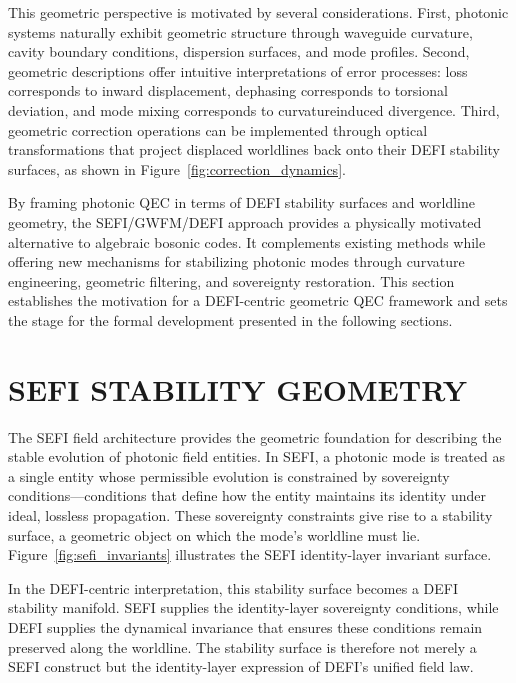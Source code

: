\documentclass[aip,adv,reprint,floatfix]{revtex4-2}
\begin{document}
This geometric perspective is motivated by several considerations. First, photonic systems naturally exhibit
geometric structure through waveguide curvature, cavity boundary conditions, dispersion surfaces, and mode
profiles.\cite{DuttonElectronField2026} Second, geometric descriptions offer intuitive
interpretations of error processes: loss corresponds to inward displacement, dephasing corresponds to torsional
deviation, and mode mixing corresponds to curvatureinduced divergence. Third, geometric correction operations can be implemented through optical transformations that project displaced worldlines back onto their
DEFI stability surfaces, as shown in Figure~\ref{fig:correction_dynamics}.

By framing photonic QEC in terms of DEFI
stability surfaces and worldline geometry, the
SEFI/GWFM/DEFI approach provides a physically motivated alternative to algebraic bosonic codes.\cite{DuttonSEFI2026}
It complements existing methods while offering new
mechanisms for stabilizing photonic modes through curvature engineering, geometric filtering, and sovereignty
restoration. This section establishes the motivation
for a DEFI-centric geometric QEC framework and sets
the stage for the formal development presented in the
following sections.
\section{SEFI STABILITY GEOMETRY}

The SEFI field architecture provides the geometric
foundation for describing the stable evolution of photonic field entities.\cite{DuttonSEFI2026} In SEFI, a photonic mode is treated
as a single entity whose permissible evolution is constrained by sovereignty conditions—conditions that define how the entity maintains its identity under ideal,
lossless propagation. These sovereignty constraints give
rise to a stability surface, a geometric object on which
the mode’s worldline must lie. Figure~\ref{fig:sefi_invariants}
illustrates the SEFI identity-layer invariant surface.

In the DEFI-centric interpretation, this stability surface becomes a DEFI stability manifold.\cite{DuttonSEFI2026,DuttonElectronField2026}
SEFI supplies the identity-layer sovereignty conditions,
while DEFI supplies the dynamical invariance that ensures these conditions remain preserved along the worldline. The stability surface is therefore not merely a SEFI construct but
the identity-layer expression of DEFI’s unified field law.
\end{document}
